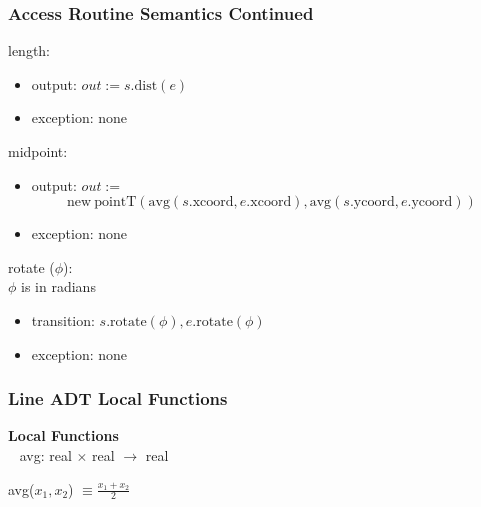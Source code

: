 \documentclass[t,12pt,numbers,fleqn]{beamer}
\begin{document}

\begin{frame}
\frametitle{Access Routine Semantics Continued}

\noindent length:
\begin{itemize}
\item output: $out := s.\mathrm{dist}(e)$
\item exception: none
\end{itemize}

\noindent midpoint:
\begin{itemize}
\item output: $out := $
$$\mathrm{new~} \mathrm{pointT} (\mathrm{avg}(s.\mathrm{xcoord}, e.\mathrm{xcoord}), \mathrm{avg}(s.\mathrm{ycoord},
e.\mathrm{ycoord}))$$
\item exception: none
\end{itemize}

\noindent rotate ($\phi$):\\
$\phi$ is in radians
\begin{itemize}
\item transition: $s.\mathrm{rotate}(\phi), e.\mathrm{rotate}(\phi)$
\item exception: none
\end{itemize}

\end{frame}


\begin{frame}
\frametitle{Line ADT Local Functions}

\textbf{Local Functions}\\
~\newline
avg: real $\times$ real $\rightarrow$ real

\noindent avg($x_1, x_2$) $\equiv \frac{x_1 + x_2}{2}$

\end{frame}


\end{document}
